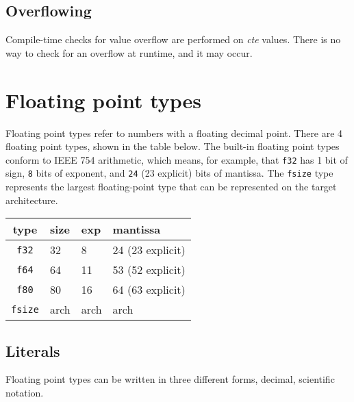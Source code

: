 \subsection{Overflowing}
\label{sec:org0881da2}

Compile-time checks for value overflow are performed on \textit{cte} values.
There is no way to check for an overflow at runtime, and it may occur.



\section{Floating point types}
\label{sec:orgae6ed5f}

Floating point types refer to numbers with a floating decimal point. There are 4
floating point types, shown in the table below. The built-in floating point
types conform to IEEE 754 arithmetic, which means, for example, that
\texttt{f32} has 1 bit of sign, \texttt{8} bits of exponent, and \texttt{24} (23
explicit) bits of mantissa. The \texttt{fsize} type represents the largest
floating-point type that can be represented on the target architecture.

\begin{center}
  \vspace{-5pt}
  \begin{tabular}{|c|lll|}
    \hline
    type & size & exp & mantissa\\[0pt]
    \hline
    \hline
    \texttt{f32} & 32 & 8 & 24 (23 explicit)\\[0pt]
    \texttt{f64} & 64 & 11 & 53 (52 explicit)\\[0pt]
    \texttt{f80} & 80 & 16 & 64 (63 explicit)\\[0pt]
    \texttt{fsize} & arch & arch & arch\\[0pt]
    \hline
  \end{tabular}
\end{center}

\subsection{Literals}
\label{sec:orgfd9f825}

Floating point types can be written in three different forms, decimal,
scientific notation.

